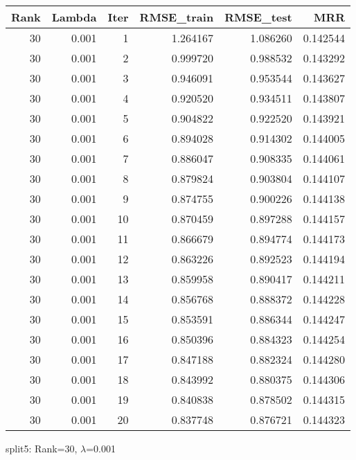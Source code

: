 \begin{tabular}{rrrrrr}
\toprule
 Rank &  Lambda &  Iter &  RMSE\_train &  RMSE\_test &       MRR \\
\midrule
   30 &   0.001 &     1 &    1.264167 &   1.086260 &  0.142544 \\
   30 &   0.001 &     2 &    0.999720 &   0.988532 &  0.143292 \\
   30 &   0.001 &     3 &    0.946091 &   0.953544 &  0.143627 \\
   30 &   0.001 &     4 &    0.920520 &   0.934511 &  0.143807 \\
   30 &   0.001 &     5 &    0.904822 &   0.922520 &  0.143921 \\
   30 &   0.001 &     6 &    0.894028 &   0.914302 &  0.144005 \\
   30 &   0.001 &     7 &    0.886047 &   0.908335 &  0.144061 \\
   30 &   0.001 &     8 &    0.879824 &   0.903804 &  0.144107 \\
   30 &   0.001 &     9 &    0.874755 &   0.900226 &  0.144138 \\
   30 &   0.001 &    10 &    0.870459 &   0.897288 &  0.144157 \\
   30 &   0.001 &    11 &    0.866679 &   0.894774 &  0.144173 \\
   30 &   0.001 &    12 &    0.863226 &   0.892523 &  0.144194 \\
   30 &   0.001 &    13 &    0.859958 &   0.890417 &  0.144211 \\
   30 &   0.001 &    14 &    0.856768 &   0.888372 &  0.144228 \\
   30 &   0.001 &    15 &    0.853591 &   0.886344 &  0.144247 \\
   30 &   0.001 &    16 &    0.850396 &   0.884323 &  0.144254 \\
   30 &   0.001 &    17 &    0.847188 &   0.882324 &  0.144280 \\
   30 &   0.001 &    18 &    0.843992 &   0.880375 &  0.144306 \\
   30 &   0.001 &    19 &    0.840838 &   0.878502 &  0.144315 \\
   30 &   0.001 &    20 &    0.837748 &   0.876721 &  0.144323 \\
\bottomrule
\end{tabular}

\caption{split5: Rank=30, $\lambda$=0.001}

